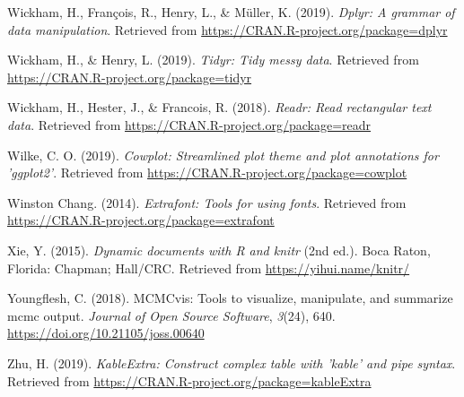 \documentclass[english,man,floatsintext]{apa6}
\begin{document}
\leavevmode\hypertarget{ref-R-dplyr}{}%
Wickham, H., François, R., Henry, L., \& Müller, K. (2019). \emph{Dplyr: A grammar of data manipulation}. Retrieved from \url{https://CRAN.R-project.org/package=dplyr}

\leavevmode\hypertarget{ref-R-tidyr}{}%
Wickham, H., \& Henry, L. (2019). \emph{Tidyr: Tidy messy data}. Retrieved from \url{https://CRAN.R-project.org/package=tidyr}

\leavevmode\hypertarget{ref-R-readr}{}%
Wickham, H., Hester, J., \& Francois, R. (2018). \emph{Readr: Read rectangular text data}. Retrieved from \url{https://CRAN.R-project.org/package=readr}

\leavevmode\hypertarget{ref-R-cowplot}{}%
Wilke, C. O. (2019). \emph{Cowplot: Streamlined plot theme and plot annotations for 'ggplot2'}. Retrieved from \url{https://CRAN.R-project.org/package=cowplot}

\leavevmode\hypertarget{ref-R-extrafont}{}%
Winston Chang. (2014). \emph{Extrafont: Tools for using fonts}. Retrieved from \url{https://CRAN.R-project.org/package=extrafont}

\leavevmode\hypertarget{ref-R-knitr}{}%
Xie, Y. (2015). \emph{Dynamic documents with R and knitr} (2nd ed.). Boca Raton, Florida: Chapman; Hall/CRC. Retrieved from \url{https://yihui.name/knitr/}

\leavevmode\hypertarget{ref-R-MCMCvis}{}%
Youngflesh, C. (2018). MCMCvis: Tools to visualize, manipulate, and summarize mcmc output. \emph{Journal of Open Source Software}, \emph{3}(24), 640. \url{https://doi.org/10.21105/joss.00640}

\leavevmode\hypertarget{ref-R-kableExtra}{}%
Zhu, H. (2019). \emph{KableExtra: Construct complex table with 'kable' and pipe syntax}. Retrieved from \url{https://CRAN.R-project.org/package=kableExtra}

\endgroup

\clearpage
\renewcommand{\listfigurename}{Figure captions}

\clearpage
\renewcommand{\listtablename}{Table captions}
\end{document}
